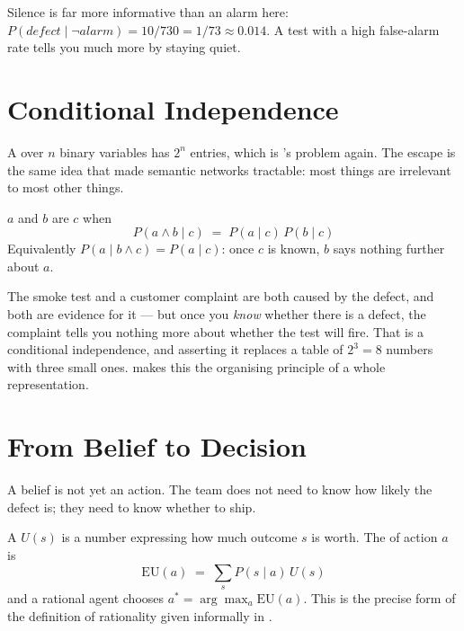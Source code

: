 Silence is far more informative than an alarm here:
$P(\mathit{defect} \mid \neg\mathit{alarm}) = 10/730 = 1/73 \approx 0.014$. A test
with a high false-alarm rate tells you much more by staying quiet.

\section{Conditional Independence}

A  over $n$ binary variables has $2^{n}$ entries, which is
's problem again. The escape is the same idea that made
semantic networks tractable: most things are irrelevant to most other things.

\begin{definitionbox}
$a$ and $b$ are  $c$ when
\[
  P(a \wedge b \mid c) \;=\; P(a \mid c)\, P(b \mid c)
\]
Equivalently $P(a \mid b \wedge c) = P(a \mid c)$: once $c$ is known, $b$ says
nothing further about $a$.
\end{definitionbox}

The smoke test and a customer complaint are both caused by the defect, and both are
evidence for it --- but once you \emph{know} whether there is a defect, the
complaint tells you nothing more about whether the test will fire. That is a
conditional independence, and asserting it replaces a table of $2^{3} = 8$ numbers
with three small ones.  makes this the organising principle of a
whole representation.

\section{From Belief to Decision}

A belief is not yet an action. The team does not need to know how likely the defect
is; they need to know whether to ship.

\begin{definitionbox}
A  $U(s)$ is a number expressing how much outcome $s$ is worth. The
 of action $a$ is
\[
  \mathrm{EU}(a) \;=\; \sum_{s} P(s \mid a)\, U(s)
\]
and a rational agent chooses $a^{*} = \arg\max_{a} \mathrm{EU}(a)$. This is the
precise form of the definition of rationality given informally in .
\end{definitionbox}

